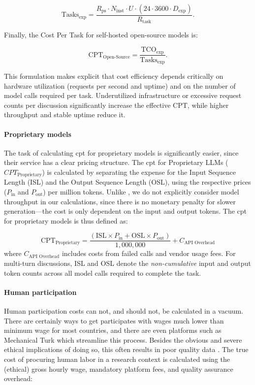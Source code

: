 \[
\text{Tasks}_{\text{exp}} =
\frac{
	R_{\text{ps}} \cdot N_{\text{inst}} \cdot U
	\cdot (24 \cdot 3600 \cdot D_{\text{exp}})
}{
	R_{\text{task}}
}.
\]

Finally, the Cost Per Task for self-hosted open-source models is:

\[
\text{CPT}_{\text{Open-Source}} =
\frac{\text{TCO}_{\text{exp}}}{\text{Tasks}_{\text{exp}}}.
\]

This formulation makes explicit that cost efficiency depends critically on hardware utilization (requests per second and uptime) and on the number of model calls required per task. Underutilized infrastructure or excessive request counts per discussion significantly increase the effective CPT, while higher throughput and stable uptime reduce it.


\paragraph{Proprietary models}
The task of calculating \ac{cpt} for proprietary models is significantly easier, since their service has a clear pricing structure. The \ac{cpt} for Proprietary LLMs ($CPT_{\text{Proprietary}}$) is calculated by separating the expense for the Input Sequence Length (ISL) and the Output Sequence Length (OSL), using the respective prices ($P_{\text{in}}$ and $P_{\text{out}}$) per million tokens. Unlike \cite{pan2025_cost_benefit}, we do not explicitly consider model throughput in our calculations, since there is no monetary penalty for slower generation---the cost is only dependent on the input and output tokens. The \ac{cpt} for proprietary models is thus defined as:

\[
\text{CPT}_{\text{Proprietary}} = \frac{(\text{ISL} \times P_{\text{in}} + \text{OSL} \times P_{\text{out}})}{1,000,000} + C_{\text{API Overhead}} 
\]
\noindent where $C_{\text{API Overhead}}$ includes costs from failed calls and vendor usage fees. For multi-turn discussions, ISL and OSL denote the \textit{non-cumulative} input and output token counts across all model calls required to complete the task.


\paragraph{Human participation}

Human participation costs can not, and should not, be calculated in a vacuum. There are certainly ways to get participates with wages much lower than minimum wage for most countries, and there are even platforms such as Mechanical Turk which streamline this process. Besides the obvious and severe ethical implications of doing so, this often results in poor quality data \cite{Moss2023}. The true cost of procuring human labor in a research context is calculated using the (ethical) gross hourly wage, mandatory platform fees, and quality assurance overhead:

